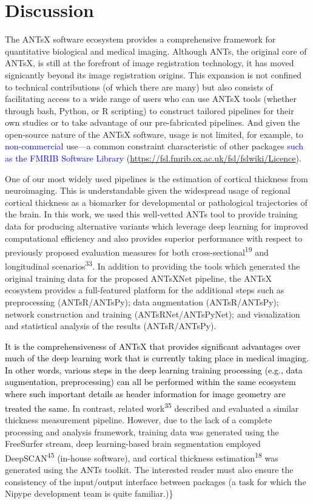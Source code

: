 \documentclass[12pt,]{article}
\begin{document}
\hypertarget{discussion}{%
\section*{Discussion}\label{discussion}}

The ANTsX software ecosystem provides a comprehensive framework for
quantitative biological and medical imaging. Although ANTs, the original
core of ANTsX, is still at the forefront of image registration
technology, it has moved signicantly beyond its image registration
origins. This expansion is not confined to technical contributions (of
which there are many) but also consists of facilitating access to a wide
range of users who can use ANTsX tools (whether through bash, Python, or
R scripting) to construct tailored pipelines for their own studies or to
take advantage of our pre-fabricated pipelines. And given the
open-source nature of the ANTsX software, usage is not limited, for
example, to \textcolor{blue}{non-commercial} use---a common constraint
characteristic of other packages
\textcolor{blue}{such as the FMRIB Software Library}
(\url{https://fsl.fmrib.ox.ac.uk/fsl/fslwiki/Licence}).

One of our most widely used pipelines is the estimation of cortical
thickness from neuroimaging. This is understandable given the widespread
usage of regional cortical thickness as a biomarker for developmental or
pathological trajectories of the brain. In this work, we used this
well-vetted ANTs tool to provide training data for producing alternative
variants which leverage deep learning for improved computational
efficiency and also provides superior performance with respect to
previously proposed evaluation measures for both
cross-sectional\textsuperscript{19} and longitudinal
scenarios\textsuperscript{33}. In addition to providing the tools which
generated the original training data for the proposed ANTsXNet pipeline,
the ANTsX ecosystem provides a full-featured platform for the additional
steps such as preprocessing (ANTsR/ANTsPy); data augmentation
(ANTsR/ANTsPy); network construction and training (ANTsRNet/ANTsPyNet);
and visualization and statistical analysis of the results
(ANTsR/ANTsPy).

\textcolor{black}{It is the comprehensiveness of ANTsX that provides significant
advantages over much of the deep learning work that is currently taking place in
medical imaging. In other words, various steps in the deep learning training
processing (e.g., data augmentation, preprocessing) can all be performed within
the same ecosystem where such important details as header information for image
geometry are treated the same.} In contrast, related
work\textsuperscript{35} described and evaluated a similar thickness
measurement pipeline. However, due to the lack of a complete processing
and analysis framework, training data was generated using the FreeSurfer
stream, deep learning-based brain segmentation employed
DeepSCAN\textsuperscript{45} (in-house software), and cortical thickness
estimation\textsuperscript{18} was generated using the ANTs toolkit. The
interested reader must also ensure the consistency of the input/output
interface between packages (a task for which the Nipype development team
is quite familiar.)\}
\end{document}
